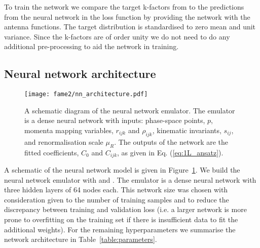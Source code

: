 \documentclass[main.tex]{subfiles}
\begin{document}
To train the network we compare the target k-factors from {\MadGraph}
to the predictions from the neural network in the loss function by
providing the network with the antenna functions.
The target distribution is standardised to zero
mean and unit variance. Since the k-factors are of order unity
we do not need to do any additional pre-processing to aid the network
in training.

\subsection*{Neural network architecture}
\begin{figure}
    \texttt{[image: fame2/nn\_architecture.pdf]}
    \caption{A schematic diagram of the neural network emulator.
    The emulator is a dense neural network with inputs:
    phase-space points, $p$, momenta mapping variables,
    $r_{ijk}$ and $\rho_{ijk}$, kinematic invariants, $s_{ij}$,
    and renormalisation scale $\mu_{R}$.
    The outputs of the network are the fitted coefficients, $C_0$ and $C_{ijk}$,
    as given in Eq. (\ref{eq:1L_ansatz}).}
    \label{fig:1L_nn}
\end{figure}
A schematic of the neural network model is given in Figure~\ref{fig:1L_nn}.
We build the neural network emulator with {\Keras}
\cite{chollet2015keras} and {\TensorFlow} \cite{tensorflow2015-whitepaper}.
The emulator is a dense neural network with
three hidden layers of 64 nodes each. This network
size was chosen with consideration given to the number
of training samples and to reduce the discrepancy between training
and validation loss
(i.e. a larger network is more prone to overfitting on the
training set if there is insufficient data to fit the additional weights).
For the remaining hyperparameters we summarise the network
architecture in Table~\ref{table:parameters}.
\end{document}

